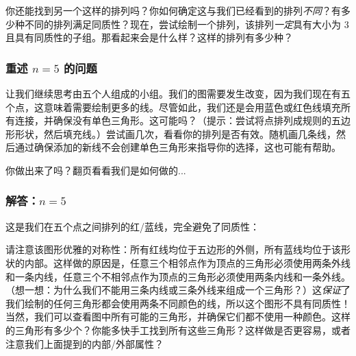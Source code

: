 你还能找到另一个这样的排列吗？你如何确定这与我们已经看到的排列\textit{不同}？有多少种不同的排列满足同质性？现在，尝试绘制一个排列，该排列\textit{一定}具有大小为 $3$ 且具有同质性的子组。那看起来会是什么样？这样的排列有多少种？

\subsubsection*{重述 $n = 5$ 的问题}

让我们继续思考由五个人组成的小组。我们的图需要发生改变，因为我们现在有五个点，这意味着需要绘制更多的线。尽管如此，我们还是会用蓝色或红色线填充所有连接，并确保没有单色三角形。这可能吗？（提示：尝试将点排列成规则的五边形形状，然后填充线。）尝试画几次，看看你的排列是否有效。随机画几条线，然后通过确保添加的新线不会创建单色三角形来指导你的选择，这也可能有帮助。

你做出来了吗？翻页看看我们是如何做的...

\clearpage

\subsubsection*{解答：$n=5$}

这是我们在五个点之间排列的红/蓝线，完全避免了同质性：

\begin{center}
\end{center}

请注意该图形优雅的对称性：所有红线均位于五边形的外侧，所有蓝线均位于该形状的内部。这样做的原因是，任意三个相邻点作为顶点的三角形必须使用两条外线和一条内线，任意三个不相邻点作为顶点的三角形必须使用两条内线和一条外线。（想一想：为什么我们不能用三条内线或三条外线来组成一个三角形？）这\textit{保证}了我们绘制的任何三角形都会使用两条不同颜色的线，所以这个图形不具有同质性！当然，我们可以查看图中所有可能的三角形，并确保它们都不使用一种颜色。这样的三角形有多少个？你能多快手工找到所有这些三角形？这样做是否更容易，或者注意我们上面提到的内部/外部属性？


